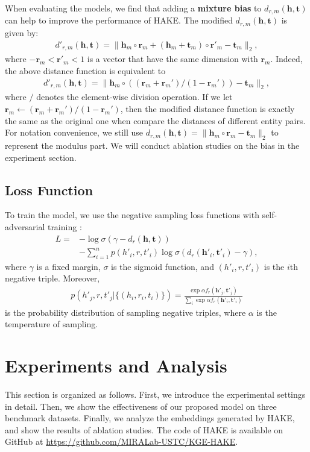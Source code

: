 \documentclass[letterpaper]{article} \usepackage{aaai20}  \usepackage{times}  \usepackage{helvet} \usepackage{courier}  \usepackage[hyphens]{url}  \usepackage{graphicx} \urlstyle{rm} \def\UrlFont{\rm}  \usepackage{graphicx}  \frenchspacing  \setlength{\pdfpagewidth}{8.5in}  \setlength{\pdfpageheight}{11in}
\newcommand{\citep}{\cite}
\begin{document}
When evaluating the models, we find that adding a \textbf{mixture bias} to $d_{r,m}(\textbf{h},\textbf{t})$ can help to improve the performance of HAKE. The modified $d_{r,m}(\textbf{h},\textbf{t})$ is given by:
\begin{align*}\label{eqn:bias}
    d'_{r,m}(\textbf{h},\textbf{t})=\|\textbf{h}_m\circ \textbf{r}_m+(\textbf{h}_m+\textbf{t}_m)\circ \textbf{r}'_m-\textbf{t}_m\|_2,
\end{align*}
where $-\textbf{r}_m<\textbf{r}'_m<1$ is a vector that have the same dimension with $\textbf{r}_m$.
Indeed, the above distance function is equivalent to 
\begin{align*}
    d'_{r,m}(\textbf{h},\textbf{t})=\|\textbf{h}_m\circ ((\textbf{r}_m+\textbf{r}_m')/(1-\textbf{r}_m'))-\textbf{t}_m\|_2,
\end{align*}
where $/$ denotes the element-wise division operation.
If we let $\textbf{r}_m\leftarrow(\textbf{r}_m+\textbf{r}_m')/(1-\textbf{r}_m')$, then the modified distance function is exactly the same as the original one when compare the distances of different entity pairs. For notation convenience, we still use $d_{r,m}(\textbf{h},\textbf{t})=\|\textbf{h}_m\circ \textbf{r}_m-\textbf{t}_m\|_2$ to represent the modulus part. We will conduct ablation studies on the bias in the experiment section.


\subsection{Loss Function}
To train the model, we use the negative sampling loss functions with self-adversarial training \citep{rotate}:
\begin{align*}
    L=&-\log\sigma(\gamma-d_r(\textbf{h},\textbf{t}))\\&-\sum_{i=1}^np(h'_i,r,t'_i)\log\sigma(d_r(\textbf{h}'_i,\textbf{t}'_i)-\gamma),
\end{align*}
where $\gamma$ is a fixed margin, $\sigma$ is the sigmoid function, and $(h'_i,r,t'_i)$ is the $i$th negative triple. Moreover,
\begin{align*}
    p(h'_j,r,t'_j|\{(h_i,r_i,t_i)\})=\frac{\exp \alpha f_r(\textbf{h}'_j, \textbf{t}'_j)}{\sum_i \exp \alpha f_r(\textbf{h}'_i, \textbf{t}'_i)}
\end{align*}
is the probability distribution of sampling negative triples, where $\alpha$ is the temperature of sampling.



\section{Experiments and Analysis}
This section is organized as follows. First, we introduce the experimental settings in detail. Then, we show the effectiveness of our proposed model on three benchmark datasets. Finally, we analyze the embeddings generated by HAKE, and show the results of ablation studies. The code of HAKE is available on GitHub at \url{https://github.com/MIRALab-USTC/KGE-HAKE}.
\end{document}
